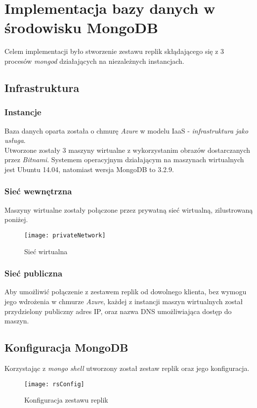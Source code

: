 \section{Implementacja bazy danych w środowisku MongoDB}
Celem implementacji było stworzenie zestawu replik skłądającego się z 3 procesów \textit{mongod} działających na niezależnych instancjach. 

\subsection{Infrastruktura}
\subsubsection{Instancje}
Baza danych oparta została o chmurę \textit{Azure} w modelu IaaS - \textit{infrastruktura jako usługa}.\\
Utworzone zostały 3 maszyny wirtualne z wykorzystanim obrazów dostarczanych przez \textit{Bitnami}. Systemem operacyjnym działającym na maszynach wirtualnych jest Ubuntu 14.04, natomiast wersja MongoDB to 3.2.9. \\

\subsubsection{Sieć wewnętrzna}
Maszyny wirtualne zostały połączone przez prywatną sieć wirtualną, zilustrowaną poniżej. 

\begin{figure}[H]
	\centering
	\texttt{[image: privateNetwork]}
	\caption{Sieć wirtualna}
	\label{fig:test}
\end{figure}

\subsubsection{Sieć publiczna}
Aby umożliwić połączenie z zestawem replik od dowolnego klienta, bez wymogu jego wdrożenia w chmurze \textit{Azure}, każdej z instancji maszyn wirtualnych został przydzielony publiczny adres IP, oraz nazwa DNS umożliwiająca dostęp do maszyn.

\subsection{Konfiguracja MongoDB}
Korzystając z \textit{mongo shell} utworzony został zestaw replik oraz jego konfiguracja. 

\begin{figure}[H]
	\centering
	\texttt{[image: rsConfig]}
	\caption{Konfiguracja zestawu replik}
\end{figure}

